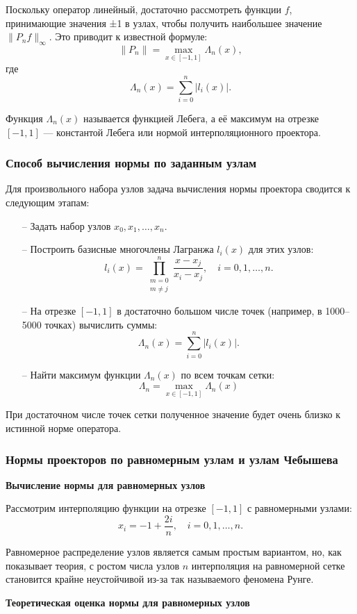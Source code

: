 \documentclass[14pt,openany,a4paper,oneside]{extarticle}
\begin{document}
	Поскольку оператор линейный, достаточно рассмотреть функции $f$, принимающие значения ±1 в узлах, чтобы получить наибольшее значение $\|P_nf\|_\infty$. Это приводит к известной формуле: $$\|P_n\|=\max_{x\in[-1,1]}\Lambda_n(x),$$
	где $$\Lambda_n(x)=\sum_{i=0}^n|l_i(x)|.$$
	
	Функция $\Lambda_n(x)$ называется функцией Лебега, а её максимум на отрезке $[-1,1]$ — константой Лебега или нормой интерполяционного проектора.
	
	\subsubsection{Способ вычисления нормы по заданным узлам}
	
	Для произвольного набора узлов задача вычисления нормы проектора сводится к следующим этапам:
	\begin{enumerate}
		\item[--] Задать набор узлов $x_0,x_1,\dots,x_n.$
		\item[--] Построить базисные многочлены Лагранжа $l_i(x)$ для этих узлов: $$l_i(x)=\prod^n_{\substack{m=0 \\ m \ne j}}\frac{x-x_j}{x_i-x_j}, \quad i=0,1,\dots,n.$$
		\item[--] На отрезке $[-1,1]$ в достаточно большом числе точек (например, в 1000–5000 точках) вычислить суммы:
		$$\Lambda_n(x)=\sum^n_{i=0}|l_i(x)|.$$
		\item[--] Найти максимум функции $\Lambda_n(x)$ по всем точкам сетки: $$\Lambda_n=\max_{x\in[-1,1]}\Lambda_n(x)$$ 
	\end{enumerate}
	
	При достаточном числе точек сетки полученное значение будет очень близко к истинной норме оператора.
	\subsubsection{Нормы проекторов по равномерным узлам и узлам Чебышева}
	\textbf{Вычисление нормы для равномерных узлов}
	
	Рассмотрим интерполяцию функции на отрезке $[-1,1]$ с равномерными узлами: $$x_i=-1+\frac{2i}{n}, \quad i=0,1,\dots,n.$$
	
	Равномерное распределение узлов является самым простым вариантом, но, как показывает теория, с ростом числа узлов $n$ интерполяция на равномерной сетке становится крайне неустойчивой из-за так называемого феномена Рунге.
	
	\textbf{Теоретическая оценка нормы для равномерных узлов}
	
\end{document}
